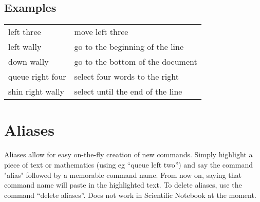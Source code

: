 \documentclass[12pt]{article}
\begin{document}
\subsection{Examples}
\begin{longtable}{ l l}
left three & move left three \\
left wally & go to the beginning of the line \\
down wally & go to the bottom of the document \\
queue right four & select four words to the right \\
shin right wally & select until the end of the line \\
\end{longtable}

\section{Aliases}
Aliases allow for easy on-the-fly creation of new commands. Simply highlight a piece of text or mathematics (using eg ``queue left two'') and say the command "alias" followed by a memorable command name. From now on, saying that command name will paste in the highlighted text. To delete aliases, use the command ``delete aliases''. Does not work in Scientific Notebook at the moment.
\end{document}
